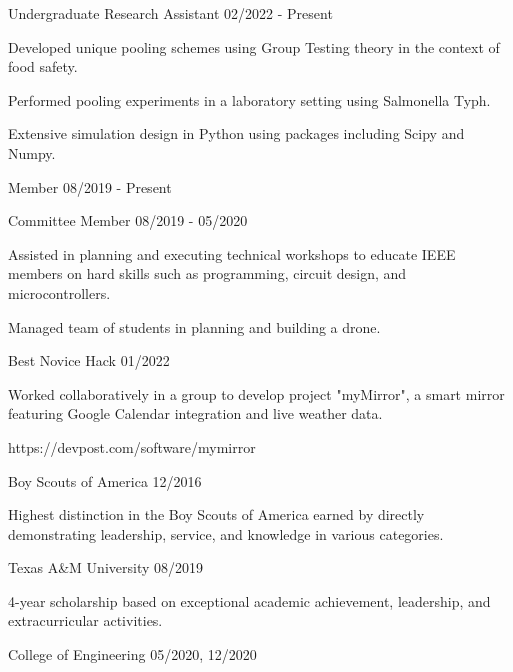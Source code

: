 \documentclass[11pt]{article}
\begin{document}
\begin{description}
\squish
{}
           {Undergraduate Research Assistant}
           {02/2022 - Present}

Developed unique pooling schemes using Group Testing theory in the context of food safety.

Performed pooling experiments in a laboratory setting using Salmonella Typh.

Extensive simulation design in Python using packages including Scipy and Numpy.

           {Member}
           {08/2019 - Present}

           {Committee Member}
           {08/2019 - 05/2020}

Assisted in planning and executing technical workshops to educate IEEE members on hard skills
such as programming, circuit design, and microcontrollers.

Managed team of students in planning and building a drone.

           {Best Novice Hack}
           {01/2022}

Worked collaboratively in a group to develop project "myMirror", a smart mirror featuring
Google Calendar integration and live weather data.

https://devpost.com/software/mymirror

\end{description}


\begin{description}
\squish
{}
           {Boy Scouts of America}
           {12/2016}

Highest distinction in the Boy Scouts of America earned by directly demonstrating
leadership, service, and knowledge in various categories.

           {Texas A\&M University}
           {08/2019}

4-year scholarship based on exceptional academic achievement, leadership, and extracurricular activities.

           {College of Engineering}
           {05/2020, 12/2020}

\end{description}
\end{document}
